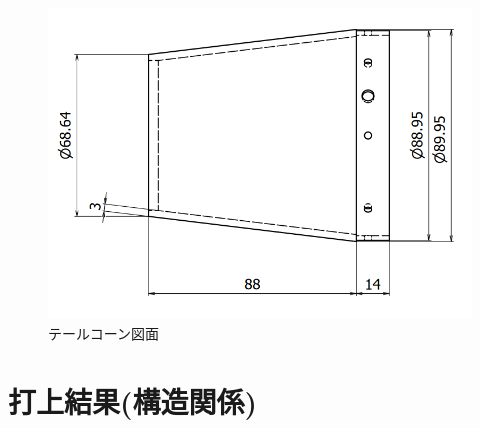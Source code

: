 \documentclass[a4paper,11pt,titlepage,uplatex]{jsarticle}
\begin{document}
\begin{figure}[H]
    \centering
    \includegraphics[scale = 0.6]{pic_str/s_talecorn_zumen.png}
    \caption{テールコーン図面}
    \label{s_tale_zumen}
\end{figure}

\vspace{30mm}

\section{打上結果(構造関係)}

\end{document}
